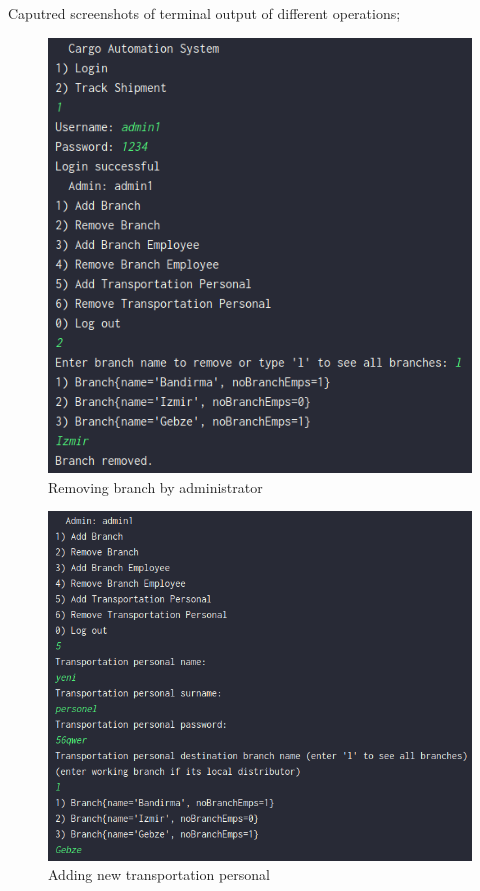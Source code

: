 \documentclass[a4paper]{article}
\begin{document}
\begin{Large}
Caputred screenshots of terminal output of different operations;

\begin{center}

\begin{figure}[htp]
	\caption{Removing branch by administrator}
	\includegraphics[scale=0.6]{6-1}
\end{figure}
\begin{figure}[htp]
	\caption{Adding new transportation personal}
	\includegraphics[scale=0.6]{6-2}

\end{figure}
\end{center}
\end{Large}
\end{document}

